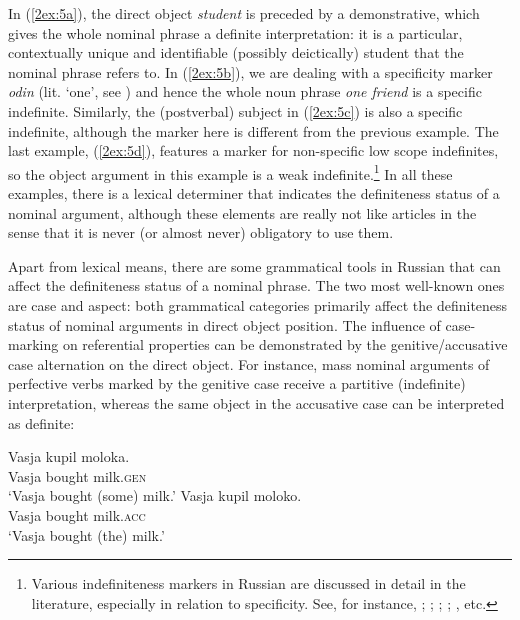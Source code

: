 \documentclass[output=paper]{langsci/langscibook}
\begin{document}
In (\ref{2ex:5a}), the direct object {\emph{student}} is preceded by a demonstrative, which gives the whole nominal phrase a definite interpretation: it is a particular, contextually unique and identifiable (possibly deictically) student that the nominal phrase refers to. In (\ref{2ex:5b}), we are dealing with a specificity marker {\emph{odin}} (lit. `one', see \citealt{ionin:13}) and hence the whole noun phrase {\emph{one friend}} is a specific indefinite. Similarly, the (postverbal) subject in (\ref{2ex:5c}) is also a specific indefinite, although the marker here is different from the previous example. The last example, (\ref{2ex:5d}), features a marker for non-specific low scope indefinites, so the object argument in this example is a weak indefinite.\footnote{Various indefiniteness markers in Russian are discussed in detail in the literature, especially in relation to specificity. See, for instance, \cite{haspelmath:97}; \cite{pereltsvaig:00}; \cite{yanovich:05}; \cite{geist:08}; \cite{ionin:13}, etc.} In all these examples, there is a lexical determiner that indicates the definiteness status of a nominal argument, although these elements are really not like articles in the sense that it is never (or almost never) obligatory to use them.

Apart from lexical means, there are some grammatical tools in Russian that can affect the definiteness status of a nominal phrase. The two most well-known ones are case and aspect: both grammatical categories primarily affect the definiteness status of nominal arguments in direct object position. The influence of case-marking on referential properties can be demonstrated by the genitive/accusative case alternation on the direct object. For instance, mass nominal arguments of perfective verbs marked by the genitive case receive a partitive (indefinite) interpretation, whereas the same object in the accusative case can be interpreted as definite: 

\begin{exe}
\ex\label{2ex:6}
	\begin{xlista}
	\ex\label{2ex:6a}
 	\gll 	Vasja	kupil 		moloka. \\
		Vasja 	bought 	milk.{\textsc{gen}} 	\\
	\glt	`Vasja bought (some) milk.'
	\ex\label{2ex:6b}
	\gll	Vasja 	kupil 		moloko. \\
		Vasja 	bought 	milk.{\textsc{acc}} \\
	\glt	`Vasja bought (the) milk.'
	\end{xlista}
\end{exe}
\end{document}
